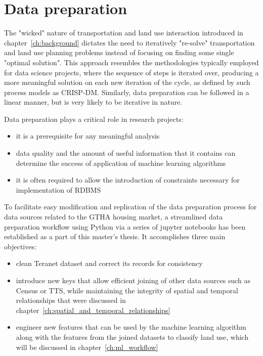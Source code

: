 \chapter{Data preparation} \label{ch:data_preparation}

The "wicked" nature of transportation and land use interaction introduced in chapter~\ref{ch:background} dictates the need to iteratively "re-solve" transportation and land use planning problems instead of focusing on finding some single "optimal solution".
This approach resembles the methodologies typically employed for data science projects, where the sequence of steps is iterated over, producing a more meaningful solution on each new iteration of the cycle, as defined by such process models as CRISP-DM\cite{Shearer2000}.
Similarly, data preparation can be followed in a linear manner, but is very likely to be iterative in nature\cite{Brownlee2013}.

\vspace{5mm}

Data preparation plays a critical role in research projects:

\begin{itemize}
    \item it is a prerequisite for any meaningful analysis
    \item data quality and the amount of useful information that it contains can determine the success of application of machine learning algorithms\cite{RaschkaMirjalili2017}
    \item it is often required to allow the introduction of constraints necessary for implementation of RDBMS
\end{itemize}

\vspace{5mm}

To facilitate easy modification and replication of the data preparation process for data sources related to the GTHA housing market, a streamlined data preparation workflow using Python via a series of jupyter notebooks has been established as a part of this master's thesis.
It accomplishes three main objectives:
\begin{itemize}
    \item clean Teranet dataset and correct its records for consistency
    \item introduce new keys that allow efficient joining of other data sources such as Census or TTS, while maintaining the integrity of spatial and temporal relationships that were discussed in chapter~\ref{ch:spatial_and_temporal_relationships}
    \item engineer new features that can be used by the machine learning algorithm along with the features from the joined datasets to classify land use, which will be discussed in chapter~\ref{ch:ml_workflow}
\end{itemize}

